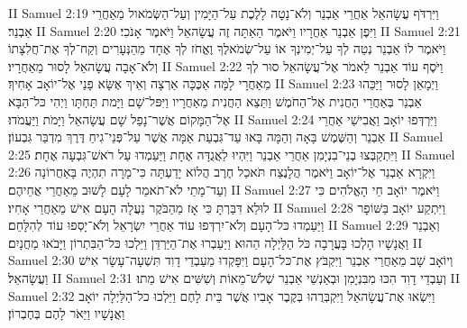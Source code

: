 II Samuel 2:19	וַיִּרְדֹּף עֲשָׂהאֵל אַחֲרֵי אַבְנֵר וְלֹא־נָטָה לָלֶכֶת עַל־הַיָּמִין וְעַל־הַשְּׂמֹאול מֵאַחֲרֵי אַבְנֵר׃
II Samuel 2:20	וַיִּפֶן אַבְנֵר אַחֲרָיו וַיֹּאמֶר הַאַתָּה זֶה עֲשָׂהאֵל וַיֹּאמֶר אָנֹכִי׃
II Samuel 2:21	וַיֹּאמֶר לוֹ אַבְנֵר נְטֵה לְךָ עַל־יְמִינְךָ אוֹ עַל־שְׂמֹאלֶךָ וֶאֱחֹז לְךָ אֶחָד מֵהַנְּעָרִים וְקַח־לְךָ אֶת־חֲלִצָתוֹ וְלֹא־אָבָה עֲשָׂהאֵל לָסוּר מֵאַחֲרָיו׃
II Samuel 2:22	וַיֹּסֶף עוֹד אַבְנֵר לֵאמֹר אֶל־עֲשָׂהאֵל סוּר לְךָ מֵאַחֲרָי לָמָּה אַכֶּכָּה אַרְצָה וְאֵיךְ אֶשָּׂא פָנַי אֶל־יוֹאָב אָחִיךָ׃
II Samuel 2:23	וַיְמָאֵן לָסוּר וַיַּכֵּהוּ אַבְנֵר בְּאַחֲרֵי הַחֲנִית אֶל־הַחֹמֶשׁ וַתֵּצֵא הַחֲנִית מֵאַחֲרָיו וַיִּפּל־שָׁם וַיָּמת תַּחְתָּו וַיְהִי כּל־הַבָּא אֶל־הַמָּקוֹם אֲשֶׁר־נָפַל שָׁם עֲשָׂהאֵל וַיָּמֹת וַיַּעֲמֹדוּ׃
II Samuel 2:24	וַיִּרְדְּפוּ יוֹאָב וַאֲבִישַׁי אַחֲרֵי אַבְנֵר וְהַשֶּׁמֶשׁ בָּאָה וְהֵמָּה בָּאוּ עַד־גִּבְעַת אַמָּה אֲשֶׁר עַל־פְּנֵי־גִיחַ דֶּרֶךְ מִדְבַּר גִּבְעוֹן׃
II Samuel 2:25	וַיִּתְקַבְּצוּ בְנֵי־בִנְיָמִן אַחֲרֵי אַבְנֵר וַיִּהְיוּ לַאֲגֻדָּה אֶחָת וַיַּעַמְדוּ עַל רֹאשׁ־גִּבְעָה אֶחָת׃
II Samuel 2:26	וַיִּקְרָא אַבְנֵר אֶל־יוֹאָב וַיֹּאמֶר הֲלָנֶצַח תֹּאכַל חֶרֶב הֲלוֹא יָדַעְתָּה כִּי־מָרָה תִהְיֶה בָּאַחֲרוֹנָה וְעַד־מָתַי לֹא־תֹאמַר לָעָם לָשׁוּב מֵאַחֲרֵי אֲחֵיהֶם׃
II Samuel 2:27	וַיֹּאמֶר יוֹאָב חַי הָאֱלֹהִים כִּי לוּלֵא דִּבַּרְתָּ כִּי אָז מֵהַבֹּקֶר נַעֲלָה הָעָם אִישׁ מֵאַחֲרֵי אָחִיו׃
II Samuel 2:28	וַיִּתְקַע יוֹאָב בַּשּׁוֹפָר וַיַּעַמְדוּ כּל־הָעָם וְלֹא־יִרְדְּפוּ עוֹד אַחֲרֵי יִשְׂרָאֵל וְלֹא־יָסְפוּ עוֹד לְהִלָּחֵם׃
II Samuel 2:29	וְאַבְנֵר וַאֲנָשָׁיו הָלְכוּ בָּעֲרָבָה כֹּל הַלַּיְלָה הַהוּא וַיַּעַבְרוּ אֶת־הַיַּרְדֵּן וַיֵּלְכוּ כּל־הַבִּתְרוֹן וַיָּבֹאוּ מַחֲנָיִם׃
II Samuel 2:30	וְיוֹאָב שָׁב מֵאַחֲרֵי אַבְנֵר וַיִּקְבֹּץ אֶת־כּל־הָעָם וַיִּפָּקְדוּ מֵעַבְדֵי דָוִד תִּשְׁעָה־עָשָׂר אִישׁ וַעֲשָׂהאֵל׃
II Samuel 2:31	וְעַבְדֵי דָוִד הִכּוּ מִבִּנְיָמִן וּבְאַנְשֵׁי אַבְנֵר שְׁלֹשׁ־מֵאוֹת וְשִׁשִּׁים אִישׁ מֵתוּ׃
II Samuel 2:32	וַיִּשְׂאוּ אֶת־עֲשָׂהאֵל וַיִּקְבְּרֻהוּ בְּקֶבֶר אָבִיו אֲשֶׁר בֵּית לָחֶם וַיֵּלְכוּ כל־הַלַּיְלָה יוֹאָב וַאֲנָשָׁיו וַיֵּאֹר לָהֶם בְּחֶבְרוֹן׃
